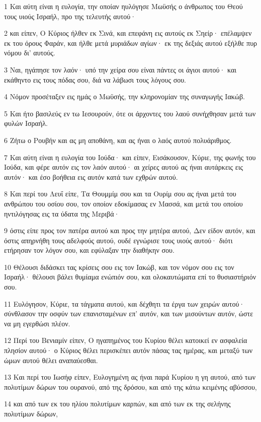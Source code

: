 \par 1 Και αύτη είναι η ευλογία, την οποίαν ηυλόγησε Μωϋσής ο άνθρωπος του Θεού τους υιούς Ισραήλ, προ της τελευτής αυτού·
\par 2 και είπεν, Ο Κύριος ήλθεν εκ Σινά, και επεφάνη εις αυτούς εκ Σηείρ· επέλαμψεν εκ του όρους Φαράν, και ήλθε μετά μυριάδων αγίων· εκ της δεξιάς αυτού εξήλθε πυρ νόμου δι' αυτούς.
\par 3 Ναι, ηγάπησε τον λαόν· υπό την χείρα σου είναι πάντες οι άγιοι αυτού· και εκάθηντο εις τους πόδας σου, διά να λάβωσι τους λόγους σου.
\par 4 Νόμον προσέταξεν εις ημάς ο Μωϋσής, την κληρονομίαν της συναγωγής Ιακώβ.
\par 5 Και ήτο βασιλεύς εν τω Ιεσουρούν, ότε οι άρχοντες του λαού συνήχθησαν μετά των φυλών Ισραήλ.
\par 6 Ζήτω ο Ρουβήν και ας μη αποθάνη, και ας ήναι ο λαός αυτού πολυάριθμος.
\par 7 Και αύτη είναι η ευλογία του Ιούδα· και είπεν, Εισάκουσον, Κύριε, της φωνής του Ιούδα, και φέρε αυτόν εις τον λαόν αυτού· αι χείρες αυτού ας ήναι αυτάρκεις εις αυτόν· και έσο βοήθεια εις αυτόν κατά των εχθρών αυτού.
\par 8 Και περί του Λευΐ είπε, Τα Θουμμίμ σου και τα Ουρίμ σου ας ήναι μετά του ανθρώπου του οσίου σου, τον οποίον εδοκίμασας εν Μασσά, και μετά του οποίου ηντιλόγησας εις τα ύδατα της Μεριβά·
\par 9 όστις είπε προς τον πατέρα αυτού και προς την μητέρα αυτού, Δεν είδον αυτόν, και όστις απηρνήθη τους αδελφούς αυτού, ουδέ εγνώρισε τους υιούς αυτού· διότι ετήρησαν τον λόγον σου, και εφύλαξαν την διαθήκην σου.
\par 10 Θέλουσι διδάσκει τας κρίσεις σου εις τον Ιακώβ, και τον νόμον σου εις τον Ισραήλ· θέλουσι βάλει θυμίαμα ενώπιόν σου, και ολοκαυτώματα επί το θυσιαστήριόν σου.
\par 11 Ευλόγησον, Κύριε, τα τάγματα αυτού, και δέχθητι τα έργα των χειρών αυτού· σύνθλασον την οσφύν των επανισταμένων επ' αυτόν, και των μισούντων αυτόν, ώστε να μη εγερθώσι πλέον.
\par 12 Περί του Βενιαμίν είπεν, Ο ηγαπημένος του Κυρίου θέλει κατοικεί εν ασφαλεία πλησίον αυτού· ο Κύριος θέλει περισκέπει αυτόν πάσας τας ημέρας, και μεταξύ των ώμων αυτού θέλει αναπαύεσθαι.
\par 13 Και περί του Ιωσήφ είπεν, Ευλογημένη ας ήναι παρά Κυρίου η γη αυτού, από των πολυτίμων δώρων του ουρανού, από της δρόσου, και από της κάτω κειμένης αβύσσου,
\par 14 και από των εκ του ηλίου πολυτίμων καρπών, και από των εκ της σελήνης πολυτίμων δώρων,
